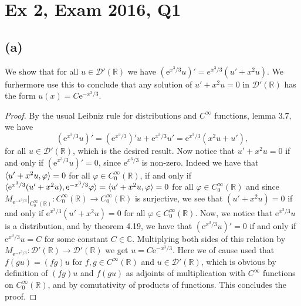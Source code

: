\documentclass[a4paper,11pt]{article}
\newcommand{\euler}[1]{\text{e}^{#1}}
\newcommand{\R}{\mathbb{R}}
\newcommand{\C}{\mathbb{C}}
\numberwithin{equation}{section}
\begin{document}
\section*{Ex 2, Exam 2016, Q1}
\setcounter{section}{2}
\subsection*{(a)}
We show that for all $ u\in\mathcal{D}'(\R) $ we have $ (\euler{x^3/3}u)'=e^{x^3/3}(u'+x^2u) $. We furhermore use this to conclude that any solution of $ u'+x^2u=0 $ in $ \mathcal{D}'(\R) $ has the form $ u(x)=C\euler{-x^3/3} $.
\begin{proof}
	By the usual Leibniz rule for distributions and $ C^\infty $ functions, lemma 3.7, we have \begin{equation}
	(\euler{x^3/3}u)'=(\euler{x^3/3})'u+\euler{x^3/3}u'=\euler{x^3/3}(x^2 u+u'),
	\end{equation}
	for all $ u\in\mathcal{D}'(\R) $, which is the desired result. Now notice that $ u'+x^2u=0 $ if and only if $ (\euler{x^3/3}u)'=0 $, since $ \euler{x^3/3} $ is non-zero. Indeed we have that $ \braket{u'+x^2u,\varphi}=0 $ for all $ \varphi\in C_0^\infty(\R) $, if and only if $ \braket{\euler{x^3/3}(u'+x^2u),\euler{-x^3/3}\varphi}=\braket{u'+x^2u,\varphi}=0 $ for all $ \varphi\in C_0^\infty(\R) $ and since $ M_{\euler{-x^3/3}}\rvert_{C_0^\infty(\R)}: C_0^\infty(\R)\to C_0^\infty(\R) $ is surjective, we see that $ (u'+x^2u)= 0 $ if and only if $ \euler{x^3/3}(u'+x^2u)= 0 $ for all $ \varphi\in C_0^\infty(\R) $. Now, we notice that $ \euler{x^3/3}u $ is a distribution, and by theorem 4.19, we have that $ (\euler{x^3/3}u )'=0 $ if and only if $ \euler{x^3/3}u =C $ for some constant $ C\in\C $. Multiplying both sides of this relation by $ M_{\euler{-x^3/3}}:\mathcal{D}'(\R)\to\mathcal{D}'(\R) $ we get $ u=C\euler{-x^3/3} $. Here we of cause used that $ f(gu)=(fg)u $ for $ f,g\in C^\infty(\R) $ and $ u\in\mathcal{D}'(\R) $, which is obvious by definition of $ (fg)u $ and $ f(gu) $ as adjoints of multiplication with $ C^\infty $ functions on $ C^\infty_0(\R) $, and by comutativity of products of functions. This concludes the proof.
\end{proof}
\end{document}
